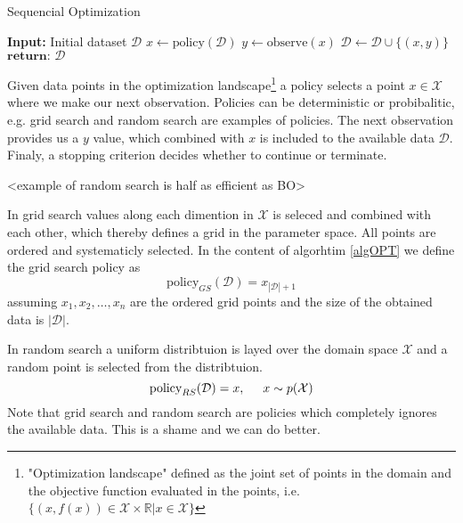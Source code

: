 \begin{algorithm}
\caption{Sequencial Optimization \cite{bayesoptbook} }\label{algOPT}
\begin{algorithmic}
\State \textbf{Input:} Initial dataset $\mathcal{D}$  
    \State $x \gets \text{policy}(\mathcal{D})$ 
    \State $y \gets \text{observe}(x)$ 
    \State $\mathcal{D} \gets \mathcal{D} \cup \{(x,y)\} $ 
\EndWhile
\State $\textbf{return: } \mathcal{D}$
\end{algorithmic}
\end{algorithm}

Given data points in the optimization landscape\footnote{"Optimization landscape" defined as the joint set of points in the domain and the objective function
evaluated in the points, i.e. $\{(x,f(x))\in \mathcal{X} \times \mathbb{R}| x \in \mathcal{X}\}$} 
a policy selects a point $x \in \mathcal{X}$ where we make our next observation. Policies can be deterministic or probibalitic, e.g. 
grid search and random search are examples of policies. The next observation provides us a $y$ value, which combined with $x$ is included to the 
available data $\mathcal{D}$. Finaly, a stopping criterion decides whether to continue or terminate. 

<example of random search is half as efficient as BO>


\begin{testexample}
    In grid search values along each dimention in $\mathcal{X}$ is seleced and combined with each
    other, which thereby defines a grid in the parameter space. All points are ordered and systematicly
    selected. In the content of algorhtim \ref{algOPT} we define the grid search policy as 
    $$\text{policy}_{GS}(\mathcal{D}) = x_{|\mathcal{D}|+1}$$
    assuming $x_1,x_2, \dots, x_{n}$ are the ordered grid points and the size of the obtained 
    data is $|\mathcal{D}|$. 
\end{testexample}
\begin{testexample}
    In random search a uniform distribtuion is layed over the domain space $\mathcal{X}$ and a random point
    is selected from the distribtuion. 
    $$\text{policy}_{RS}(\mathcal{D}) = x, \hspace{0.5cm} x \sim p(\mathcal{X})$$
    Note that grid search and random search are policies which completely 
    ignores the available data. This is a shame and we can do better. 
\end{testexample}


